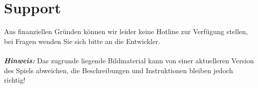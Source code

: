 \documentclass[12pt, a4paper]{scrreprt}
\begin{document}
\chapter{Support}
Aus finanziellen Gründen können wir leider keine Hotline zur Verfügung stellen, bei Fragen wenden Sie sich bitte an die Entwickler.\\\\
\textbf{\textit{Hinweis:}} Das zugrunde liegende Bildmaterial kann von einer aktuelleren Version des Spiels abweichen, die Beschreibungen und Instruktionen bleiben jedoch richtig!
\end{document}
